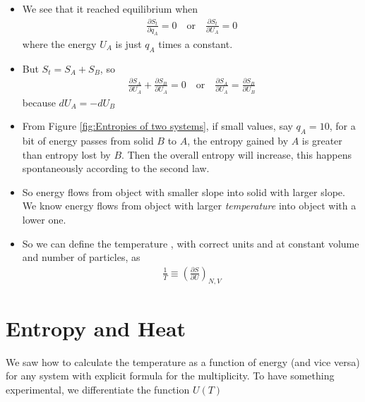 \documentclass{book}
\begin{document}
\begin{itemize}
	\item We see that it reached equilibrium when
	      \begin{align}
		      \frac{\partial S_{t}}{\partial q_A} = 0
		      \quad \text{or} \quad \frac{\partial S_{t}}{\partial U_A} = 0
	      \end{align}
	      where the energy $U_A$ is just $q_A$ times a constant.
	\item But $S_t = S_A + S_B$, so
	      \begin{align}
		      \frac{\partial S_A}{\partial U_A} + \frac{\partial S_B}{\partial U_A} = 0 \quad \text{or} \quad
		      \frac{\partial S_A}{\partial U_A} = \frac{\partial S_B}{\partial U_B}
	      \end{align}
	      because $dU_A = -dU_B$
	\item From Figure \ref{fig:Entropies of two systems}, if small values, say $q_A= 10$, for a bit of energy
	      passes from solid $B$ to $A$, the entropy gained by $A$ is greater than entropy lost by $B$. Then the overall
	      entropy will increase, this happens spontaneously according to the second law.
	\item So energy flows from object with smaller slope into solid with larger slope. We know energy flows from
	      object with larger \textit{temperature} into object with a lower one.
	\item So we can define the temperature , with correct units and at constant volume and
	      number of particles, as
	      \begin{align}
		      \label{eq:temperatue def}
		      \frac{1}{T} \equiv \left( \frac{\partial S}{\partial U} \right)_{N,V}
	      \end{align}
\end{itemize}

\section{Entropy and Heat}%
\label{sec:entropy and heat}

We saw how to calculate the temperature as a function of energy (and vice versa) for any system with
explicit formula for the multiplicity. To have something experimental, we differentiate the function
$U(T)$
\end{document}
